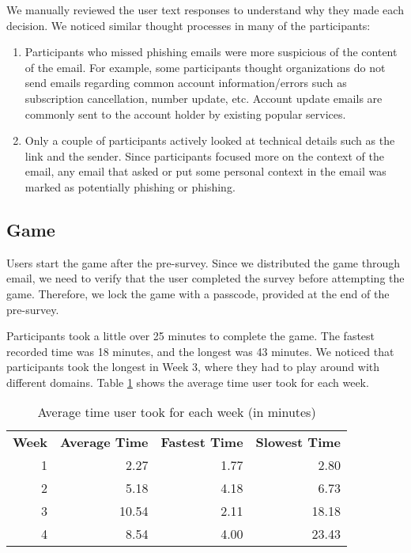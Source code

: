 We manually reviewed the user text responses to understand why they made each decision. We noticed similar thought processes in many of the participants:

\begin{enumerate}
    \item Participants who missed phishing emails were more suspicious of the content of the email. For example, some participants thought organizations do not send emails regarding common account information/errors such as subscription cancellation, number update, etc. Account update emails are commonly sent to the account holder by existing popular services.
    \item Only a couple of participants actively looked at technical details such as the link and the sender. Since participants focused more on the context of the email, any email that asked or put some personal context in the email was marked as potentially phishing or phishing.
\end{enumerate}

\subsection{Game}
Users start the game after the pre-survey. Since we distributed the game through email, we need to verify that the user completed the survey before attempting the game. Therefore, we lock the game with a passcode, provided at the end of the pre-survey.

Participants took a little over 25 minutes to complete the game. The fastest recorded time was 18 minutes, and the longest was 43 minutes. We noticed that participants took the longest in Week 3, where they had to play around with different domains. Table \ref{tab:game_time} shows the average time user took for each week.

\begin{table}[!ht]
    \centering
    \begin{tabular}{r r r r }
        \hline
        \textbf{Week} & \textbf{Average Time} & \textbf{Fastest Time} & \textbf{Slowest Time} \\
        1             & 2.27                  & 1.77                  & 2.80                  \\
        2             & 5.18                  & 4.18                  & 6.73                  \\
        3             & 10.54                 & 2.11                  & 18.18                 \\
        4             & 8.54                  & 4.00                  & 23.43                 \\
        \hline
    \end{tabular}
    \caption{Average time user took for each week (in minutes)}
    \label{tab:game_time}
\end{table}

